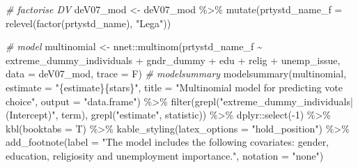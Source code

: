 \documentclass[
]{article}
\newenvironment{Shaded}{\begin{snugshade}}{\end{snugshade}}
\newcommand{\AttributeTok}[1]{\textcolor[rgb]{0.77,0.63,0.00}{#1}}
\newcommand{\CommentTok}[1]{\textcolor[rgb]{0.56,0.35,0.01}{\textit{#1}}}
\newcommand{\DecValTok}[1]{\textcolor[rgb]{0.00,0.00,0.81}{#1}}
\newcommand{\FunctionTok}[1]{\textcolor[rgb]{0.00,0.00,0.00}{#1}}
\newcommand{\NormalTok}[1]{#1}
\newcommand{\OtherTok}[1]{\textcolor[rgb]{0.56,0.35,0.01}{#1}}
\newcommand{\SpecialCharTok}[1]{\textcolor[rgb]{0.00,0.00,0.00}{#1}}
\newcommand{\StringTok}[1]{\textcolor[rgb]{0.31,0.60,0.02}{#1}}
\begin{document}
\begin{Shaded}
\begin{Highlighting}[]
\CommentTok{\# factorise DV}
\NormalTok{deV07\_mod }\OtherTok{\textless{}{-}}\NormalTok{ deV07\_mod }\SpecialCharTok{\%\textgreater{}\%}
  \FunctionTok{mutate}\NormalTok{(}\AttributeTok{prtystd\_name\_f =} \FunctionTok{relevel}\NormalTok{(}\FunctionTok{factor}\NormalTok{(prtystd\_name), }\StringTok{"Lega"}\NormalTok{))}

\CommentTok{\# model}
\NormalTok{multinomial }\OtherTok{\textless{}{-}}\NormalTok{ nnet}\SpecialCharTok{::}\FunctionTok{multinom}\NormalTok{(prtystd\_name\_f }\SpecialCharTok{\textasciitilde{}}\NormalTok{ extreme\_dummy\_individuals }\SpecialCharTok{+}\NormalTok{ gndr\_dummy }\SpecialCharTok{+}\NormalTok{ edu }\SpecialCharTok{+}\NormalTok{ relig }\SpecialCharTok{+}\NormalTok{ unemp\_issue, }
                     \AttributeTok{data =}\NormalTok{ deV07\_mod, }\AttributeTok{trace =}\NormalTok{ F)}
\CommentTok{\# modelsummary }
\FunctionTok{modelsummary}\NormalTok{(multinomial,}
             \AttributeTok{estimate =} \StringTok{"\{estimate\}\{stars\}"}\NormalTok{, }
             \AttributeTok{title =} \StringTok{"Multinomial model for predicting vote choice"}\NormalTok{,}
             \AttributeTok{output =} \StringTok{"data.frame"}\NormalTok{) }\SpecialCharTok{\%\textgreater{}\%}
  \FunctionTok{filter}\NormalTok{(}\FunctionTok{grepl}\NormalTok{(}\StringTok{"extreme\_dummy\_individuals|(Intercept)"}\NormalTok{, term), }
         \FunctionTok{grepl}\NormalTok{(}\StringTok{"estimate"}\NormalTok{, statistic)) }\SpecialCharTok{\%\textgreater{}\%}
\NormalTok{  dplyr}\SpecialCharTok{::}\FunctionTok{select}\NormalTok{(}\SpecialCharTok{{-}}\DecValTok{1}\NormalTok{) }\SpecialCharTok{\%\textgreater{}\%}
  \FunctionTok{kbl}\NormalTok{(}\AttributeTok{booktabs =}\NormalTok{ T) }\SpecialCharTok{\%\textgreater{}\%}
  \FunctionTok{kable\_styling}\NormalTok{(}\AttributeTok{latex\_options =} \StringTok{"hold\_position"}\NormalTok{) }\SpecialCharTok{\%\textgreater{}\%}
  \FunctionTok{add\_footnote}\NormalTok{(}\AttributeTok{label =} \StringTok{"The model includes the following covariates: gender, education, religiosity and unemployment importance."}\NormalTok{, }\AttributeTok{notation =} \StringTok{"none"}\NormalTok{)}
\end{Highlighting}
\end{Shaded}
\end{document}
